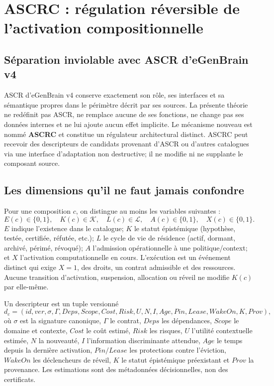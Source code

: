 \section{ASCRC : régulation réversible de l'activation compositionnelle}
\subsection{Séparation inviolable avec ASCR d'eGenBrain v4}
ASCR d'eGenBrain v4 conserve exactement son rôle, ses interfaces et sa sémantique propres dans le périmètre décrit par ses sources. La présente théorie ne redéfinit pas ASCR, ne remplace aucune de ses fonctions, ne change pas ses données internes et ne lui ajoute aucun effet implicite. Le mécanisme nouveau est nommé \textbf{ASCRC} et constitue un régulateur architectural distinct. ASCRC peut recevoir des descripteurs de candidats provenant d'ASCR ou d'autres catalogues via une interface d'adaptation non destructive; il ne modifie ni ne supplante le composant source.

\subsection{Les dimensions qu'il ne faut jamais confondre}
Pour une composition $c$, on distingue au moins les variables suivantes :
\[
E(c)\in\{0,1\},\quad K(c)\in\mathcal{K},\quad L(c)\in\mathcal{L},\quad A(c)\in\{0,1\},\quad X(c)\in\{0,1\}.
\]
$E$ indique l'existence dans le catalogue; $K$ le statut épistémique (hypothèse, testée, certifiée, réfutée, etc.); $L$ le cycle de vie de résidence (actif, dormant, archivé, périmé, révoqué); $A$ l'admission opérationnelle à une politique/context; et $X$ l'activation computationnelle en cours. L'exécution est un événement distinct qui exige $X=1$, des droits, un contrat admissible et des ressources. Aucune transition d'activation, suspension, allocation ou réveil ne modifie $K(c)$ par elle-même.

\begin{definition}
Un descripteur est un tuple versionné
\[
 d_c=(id,ver,\sigma,\Gamma,Deps,Scope,Cost,Risk,U,N,I,Age,Pin,Lease,WakeOn,K,Prov),
\]
où $\sigma$ est la signature canonique, $\Gamma$ le contrat, $Deps$ les dépendances, $Scope$ le domaine et contexte, $Cost$ le coût estimé, $Risk$ les risques, $U$ l'utilité contextuelle estimée, $N$ la nouveauté, $I$ l'information discriminante attendue, $Age$ le temps depuis la dernière activation, $Pin/Lease$ les protections contre l'éviction, $WakeOn$ les déclencheurs de réveil, $K$ le statut épistémique préexistant et $Prov$ la provenance. Les estimations sont des métadonnées décisionnelles, non des certificats.
\end{definition}

